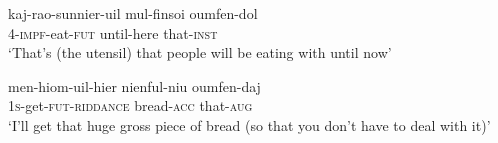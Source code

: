 \documentclass[12]{article}
\begin{document}
\begin{exe}
\ex \label{ex:eating_thing}
\gll kaj-rao-sunnier-uil mul-finsoi oumfen-dol \\
  4-\textsc{impf}-eat-\textsc{fut} until-here that-\textsc{inst} \\
\trans `That’s (the utensil) that people will be eating with until now’
\end{exe}

\begin{exe}
\ex \label{ex:gross_bread}
\gll men-hiom-uil-hier nienful-niu oumfen-daj \\
\textsc{1s}-get-\textsc{fut}-\textsc{riddance} bread-\textsc{acc} that-\textsc{aug} \\
\glt `I'll get that huge gross piece of bread (so that you don't have to deal with it)'
\end{exe}
\end{document}
